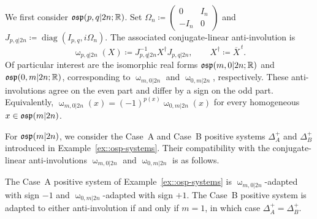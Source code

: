 We first consider ${\mathfrak{osp}}(p,q\vert 2n;{\mathbb R})$. Set
$\Omega_n\coloneqq\left(\begin{smallmatrix}0&I_n\\-I_n&0\end{smallmatrix}\right)$
and
$J_{p,q\vert 2n}\coloneqq\operatorname{diag}(I_{p,q},i\Omega_n)$.
The associated conjugate-linear anti-involution is
\begin{equation}
\upomega_{p,q\vert 2n}(X)
\coloneqq
J_{p,q\vert 2n}^{-1}X^\dagger J_{p,q\vert 2n},
\qquad
X^\dagger\coloneqq\overline{X}^{\,t}.
\end{equation}
Of particular interest are the isomorphic real forms
${\mathfrak{osp}}(m,0\vert 2n;{\mathbb R})$ and ${\mathfrak{osp}}(0,m\vert 2n;{\mathbb R})$, corresponding to
$\upomega_{m,0\vert 2n}$ and $\upomega_{0,m\vert 2n}$, respectively. These
anti-involutions agree on the even part and differ by a sign on the odd
part. Equivalently,
$
\upomega_{m,0\vert 2n}(x)
=
(-1)^{p(x)}\upomega_{0,m\vert 2n}(x)
$
for every homogeneous $x\in{\mathfrak{osp}}(m\vert 2n)$.

For ${\mathfrak{osp}}(m\vert 2n)$, we consider the Case~A and Case~B positive systems
$\Delta_A^{+}$ and $\Delta_B^{+}$ introduced in
Example~\ref{ex::osp-systems}. Their compatibility with the
conjugate-linear anti-involutions $\upomega_{m,0\vert 2n}$ and $\upomega_{0,m\vert 2n}$ is as follows. 

\begin{lemma}\label{lemm::adapted_systems_osp}
The Case~A positive system of Example~\ref{ex::osp-systems} is
$\upomega_{m,0\vert 2n}$-adapted with sign $-1$ and
$\upomega_{0,m\vert 2n}$-adapted with sign $+1$. The Case~B positive
system is adapted to either anti-involution if and only if $m=1$, in which
case $\Delta_A^{+}=\Delta_B^{+}$.
\end{lemma}

